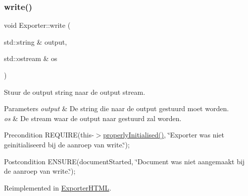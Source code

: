 \subsubsection{\texorpdfstring{write()}{write()}}
{\footnotesize\ttfamily void Exporter\+::write (\begin{DoxyParamCaption}\item[{std\+::string \&}]{output,  }\item[{std\+::ostream \&}]{os }\end{DoxyParamCaption})\hspace{0.3cm}{\ttfamily [virtual]}}



Stuur de output string naar de output stream. 


\begin{DoxyParams}{Parameters}
{\em output} & De string die naar de output gestuurd moet worden. \\
\hline
{\em os} & De stream waar de output naar gestuurd zal worden. \\
\hline
\end{DoxyParams}
\begin{DoxyPrecond}{Precondition}
R\+E\+Q\+U\+I\+RE(this-\/$>$\hyperlink{class_exporter_aafd9df9210aeefd7bb7fd434fc317cf0}{properly\+Initialised()}, \char`\"{}\+Exporter was niet geinitialiseerd bij de aanroep van write.\char`\"{}); 
\end{DoxyPrecond}
\begin{DoxyPostcond}{Postcondition}
E\+N\+S\+U\+RE(document\+Started, \char`\"{}\+Document was niet aangemaakt bij de aanroep van write.\char`\"{}); 
\end{DoxyPostcond}


Reimplemented in \hyperlink{class_exporter_h_t_m_l_ace2649c240282289d4cb3bfbd19e427c}{Exporter\+H\+T\+ML}.

